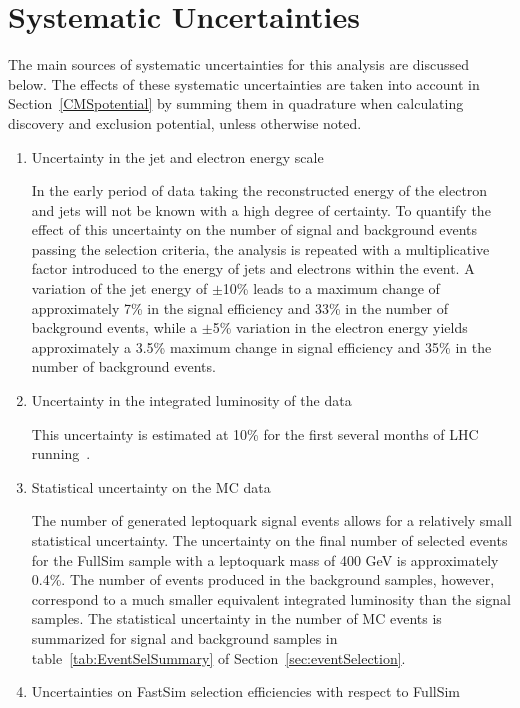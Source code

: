 %

\section{Systematic Uncertainties} \label{sec:Systematics}

The main sources of systematic uncertainties for this analysis are discussed below.
The effects of these systematic uncertainties are taken into account in Section~\ref{CMSpotential} 
by summing them in quadrature when calculating discovery and exclusion potential, unless otherwise noted.
%
\begin{enumerate}
\item Uncertainty in the jet and electron energy scale

In the early period of data taking the reconstructed energy of the electron and jets will not be known with 
a high degree of certainty. To quantify the effect of this uncertainty on the number of signal and background events
passing the selection criteria, the analysis is repeated with a multiplicative factor introduced to the energy 
of jets and electrons within the event. 
A variation of the jet energy of $\pm$10\% leads to a maximum change of approximately 
7\% in the signal efficiency and 33\% in the number of background events, 
while a $\pm$5\% variation in the electron energy yields approximately a 3.5\% maximum 
change in signal efficiency and 35\% in the number of background events. 
%
\item Uncertainty in the integrated luminosity of the data

This uncertainty is estimated at 10\% for the first several months of LHC running~\cite{PTDR}. 
%
\item Statistical uncertainty on the MC data

The number of generated leptoquark signal events allows for a relatively small statistical uncertainty.
The uncertainty on the final number of selected events for the FullSim sample with a leptoquark mass of 400 GeV is 
approximately 0.4\%.  The number of events produced in the background samples, however, correspond to a much
smaller equivalent integrated luminosity than the signal samples.  
The statistical uncertainty in the number of MC events is summarized for signal and background samples 
in table~\ref{tab:EventSelSummary} of Section~\ref{sec:eventSelection}.  
%
\item Uncertainties on FastSim selection efficiencies with respect to FullSim


\end{enumerate}
